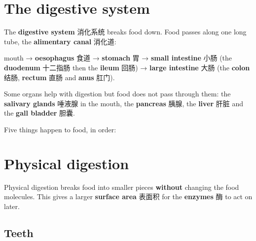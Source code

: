 \documentclass[11pt]{article}
\begin{document}
\section*{The digestive system}

The \textbf{digestive system} 消化系统 breaks food down. Food passes along one long tube, the \textbf{alimentary canal} 消化道:

mouth → \textbf{oesophagus} 食道 → \textbf{stomach} 胃 → \textbf{small intestine} 小肠 (the \textbf{duodenum} 十二指肠 then the \textbf{ileum} 回肠) → \textbf{large intestine} 大肠 (the \textbf{colon} 结肠, \textbf{rectum} 直肠 and \textbf{anus} 肛门).

Some organs help with digestion but food does not pass through them: the \textbf{salivary glands} 唾液腺 in the mouth, the \textbf{pancreas} 胰腺, the \textbf{liver} 肝脏 and the \textbf{gall bladder} 胆囊.

Five things happen to food, in order:

\begin{center}
\end{center}

\section*{Physical digestion}

Physical digestion breaks food into smaller pieces \textbf{without} changing the food molecules. This gives a larger \textbf{surface area} 表面积 for the \textbf{enzymes} 酶 to act on later.

\subsection*{Teeth}
\end{document}

